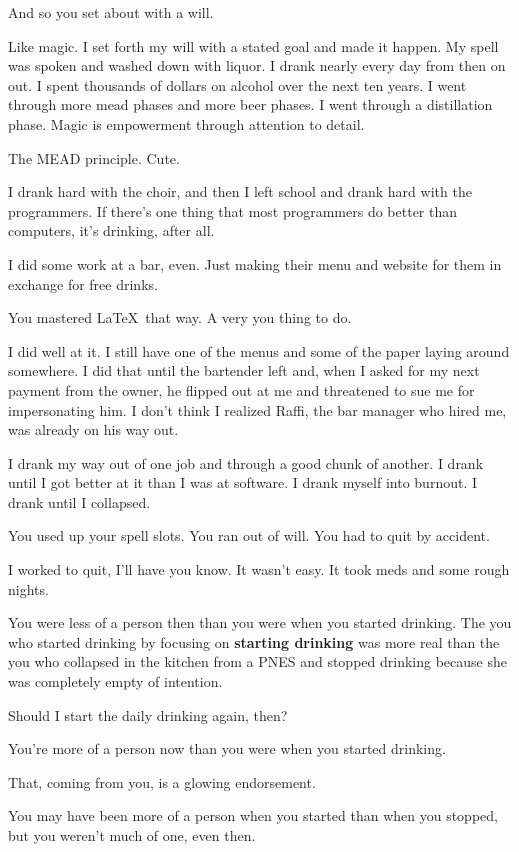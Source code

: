 \begin{paracol}{2}
\begin{leftcolumn}
\begin{ally}
And so you set about with a will.
\end{ally}
Like magic. I set forth my will with a stated goal and made it happen. My spell was spoken and washed down with liquor. I drank nearly every day from then on out. I spent thousands of dollars on alcohol over the next ten years. I went through more mead phases and more beer phases. I went through a distillation phase. Magic is empowerment through attention to detail.

\begin{ally}
The MEAD principle. Cute.
\end{ally}
I drank hard with the choir, and then I left school and drank hard with the programmers. If there's one thing that most programmers do better than computers, it's drinking, after all.

I did some work at a bar, even. Just making their menu and website for them in exchange for free drinks.

\begin{ally}
You mastered \LaTeX\ that way. A very you thing to do.
\end{ally}
I did well at it. I still have one of the menus and some of the paper laying around somewhere. I did that until the bartender left and, when I asked for my next payment from the owner, he flipped out at me and threatened to sue me for impersonating him. I don't think I realized Raffi, the bar manager who hired me, was already on his way out.

I drank my way out of one job and through a good chunk of another. I drank until I got better at it than I was at software. I drank myself into burnout. I drank until I collapsed.

\begin{ally}
You used up your spell slots. You ran out of will. You had to quit by accident.
\end{ally}
I worked to quit, I'll have you know. It wasn't easy. It took meds and some rough nights.

\begin{ally}
You were less of a person then than you were when you started drinking. The you who started drinking by focusing on \textbf{starting drinking} was more real than the you who collapsed in the kitchen from a PNES and stopped drinking because she was completely empty of intention.
\end{ally}
Should I start the daily drinking again, then?

\begin{ally}
You're more of a person now than you were when you started drinking.
\end{ally}
That, coming from you, is a glowing endorsement.

\begin{ally}
You may have been more of a person when you started than when you stopped, but you weren't much of one, even then.
\end{ally}
\newpage
\end{leftcolumn}
\end{paracol}
